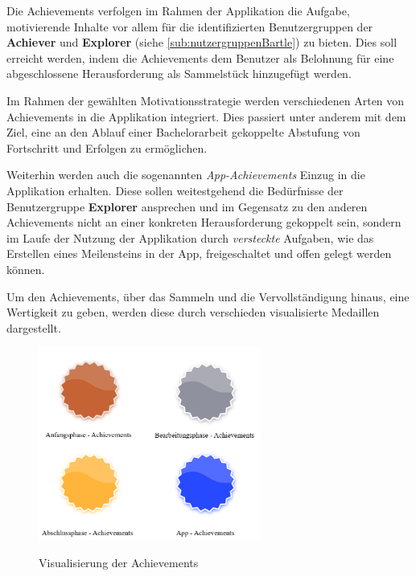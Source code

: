 \documentclass[bibliography=totoc,listof=totoc,BCOR=5mm,DIV=12,oneside]{scrbook}
\begin{document}
\par \bigskip Die Achievements verfolgen im Rahmen der Applikation die Aufgabe, motivierende Inhalte vor allem für die identifizierten Benutzergruppen der \textbf{Achiever} und \textbf{Explorer} (siehe \ref{sub:nutzergruppenBartle}) zu bieten. Dies soll erreicht werden, indem die Achievements dem Benutzer als Belohnung für eine abgeschlossene Herausforderung als Sammelstück hinzugefügt werden.
\par \medskip Im Rahmen der gewählten Motivationsstrategie werden verschiedenen Arten von Achievements in die Applikation integriert. Dies passiert unter anderem mit dem Ziel, eine an den Ablauf einer Bachelorarbeit gekoppelte Abstufung von Fortschritt und Erfolgen zu ermöglichen. 
\par Weiterhin werden auch die sogenannten \textit{App-Achievements} Einzug in die Applikation erhalten. Diese sollen weitestgehend die Bedürfnisse der Benutzergruppe \textbf{Explorer} ansprechen und im Gegensatz zu den anderen Achievements nicht an einer konkreten Herausforderung gekoppelt sein, sondern im Laufe der Nutzung der Applikation durch \textit{versteckte} Aufgaben, wie das Erstellen eines Meilensteins in der App, freigeschaltet und offen gelegt werden können.

\par \medskip Um den Achievements, über das Sammeln und die Vervollständigung hinaus, eine Wertigkeit zu geben, werden diese durch verschieden visualisierte Medaillen dargestellt. 

\medskip
\begin{figure}[H]
\centering

	{\includegraphics[width=0.65\textwidth]{Bilder/AchievementsVisualisierung.png}}

	\caption{Visualisierung der Achievements}
	\label{img:achievements}
\end{figure}
\end{document}
